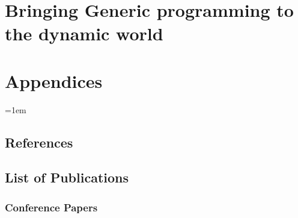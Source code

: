 \documentclass[11pt,a4paper]{book}
\begin{document}


\cleardoublepage


\part{Bringing Generic programming to the dynamic world}
\label{part:dynamic.world}



\cleardoublepage



\cleardoublepage


\part{Appendices}
\label{part:annexes}

\appendix

\emergencystretch=1em

\chapter{References}
\label{chap:bibliography}

\printbibliography[category=cited,heading=bibintoc]


\cleardoublepage

\chapter{List of Publications}
\label{chap:publications}

\section*{Conference Papers}

 \\

\noindent{} \\

\cleardoublepage




\end{document}
